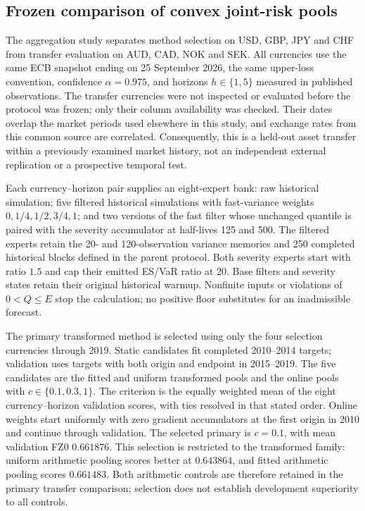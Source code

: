\documentclass[11pt,a4paper]{article}
\theoremstyle{definition}\newtheorem{definition}[theorem]{Definition}
\begin{document}
\subsection{Frozen comparison of convex joint-risk pools}\label{sec:aggregateprotocol}
The aggregation study separates method selection on USD, GBP, JPY and CHF from transfer evaluation on AUD, CAD, NOK and SEK. All currencies use the same ECB snapshot ending on 25 September 2026, the same upper-loss convention, confidence $\alpha=0.975$, and horizons $h\in\{1,5\}$ measured in published observations. The transfer currencies were not inspected or evaluated before the protocol was frozen; only their column availability was checked. Their dates overlap the market periods used elsewhere in this study, and exchange rates from this common source are correlated. Consequently, this is a held-out asset transfer within a previously examined market history, not an independent external replication or a prospective temporal test.

Each currency--horizon pair supplies an eight-expert bank: raw historical simulation; five filtered historical simulations with fast-variance weights $0,1/4,1/2,3/4,1$; and two versions of the fast filter whose unchanged quantile is paired with the severity accumulator at half-lives 125 and 500. The filtered experts retain the 20- and 120-observation variance memories and 250 completed historical blocks defined in the parent protocol. Both severity experts start with ratio $1.5$ and cap their emitted ES/VaR ratio at 20. Base filters and severity states retain their original historical warmup. Nonfinite inputs or violations of $0<Q\le E$ stop the calculation; no positive floor substitutes for an inadmissible forecast.

The primary transformed method is selected using only the four selection currencies through 2019. Static candidates fit completed 2010--2014 targets; validation uses targets with both origin and endpoint in 2015--2019. The five candidates are the fitted and uniform transformed pools and the online pools with $c\in\{0.1,0.3,1\}$. The criterion is the equally weighted mean of the eight currency--horizon validation scores, with ties resolved in that stated order. Online weights start uniformly with zero gradient accumulators at the first origin in 2010 and continue through validation. The selected primary is $c=0.1$, with mean validation FZ0 $0.661876$. This selection is restricted to the transformed family: uniform arithmetic pooling scores better at $0.643864$, and fitted arithmetic pooling scores $0.661483$. Both arithmetic controls are therefore retained in the primary transfer comparison; selection does not establish development superiority to all controls.
\end{document}
